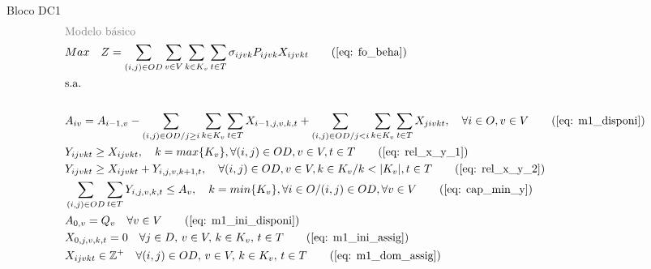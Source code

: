 \begin{bloque1}{Bloco \hypertarget{frase:DC1}{DC1} }
\allowdisplaybreaks
\begin{align}
	 & \textcolor{gray}{\text{Modelo básico}} \notag   \\
	 & Max \quad Z = \sum_{(i,j)\in OD} \sum_{v\in V} \sum_{k\in K_v} \sum_{t\in T} \sigma_{ijvk}  P_{ijvk} X_{ijvkt}     \tag{\ref{eq: fo_beha}}                                                                                 \\
	 & \text{s.a.}  \notag   \\ \notag                                                                                                                                                                                                     \\
	 & A_{iv} = A_{i-1,v} - \sum_{(i,j) \in OD/j \geq i} \sum_{k\in K_v}\sum_{t\in T}X_{i-1,j,v,k,t} + \sum_{(i,j) \in OD/j<i} \sum_{k\in K_v}\sum_{t\in T}X_{jivkt}, \quad \forall i \in O, v \in V   \tag{\ref{eq: m1_disponi}} \\
	 & Y_{ijvkt} \geq  X_{ijvkt},  \quad k = max\{K_v\}, \forall(i,j) \in OD ,v \in V, t \in T      \tag{\ref{eq: rel_x_y_1}}                                                                                                     \\
	 & Y_{ijvkt} \geq  X_{ijvkt} + Y_{i,j,v,k + 1,t} , \quad \forall(i,j) \in OD, v \in V, k \in K_v / k < |K_v| , t \in T       \tag{\ref{eq: rel_x_y_2}}                                                            \\
	 & \sum_{(i,j) \in OD}\sum_{t\in T} Y_{i,j,v,k,t} \leq A_v, \quad  k = min\{K_v\}, \forall i \in O / (i,j) \in OD,   \forall v \in V     \tag{\ref{eq: cap_min_y}}                                                            \\
	 & A_{0,v} = Q_v \quad \forall v \in V  \tag{\ref{eq: m1_ini_disponi}}                                                                                                                                                        \\
	 & X_{0,j,v,k,t} = 0 \quad \forall j \in D,\, v \in V,\, k \in K_v,\, t \in T  \tag{\ref{eq: m1_ini_assig}}                                                                                                                   \\
	 & X_{ijvkt} \in \mathbb{Z}^+ \quad \forall(i,j) \in OD,\, v \in V,\, k \in K_v,\, t \in T  \tag{\ref{eq: m1_dom_assig}}                                                                                                      \\

\end{align}
\end{bloque1}
